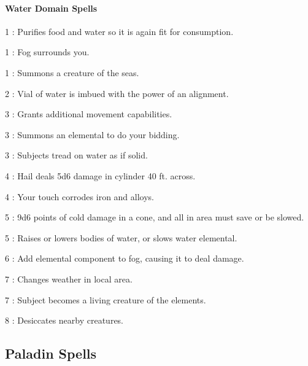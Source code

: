 \paragraph{Water Domain Spells}
\begin{list}{}{\leftmargin=1em}
\item[1] : Purifies food and water so it is again fit for consumption.
\item[1] : Fog surrounds you.
\item[1] : Summons a creature of the seas.
\item[2] : Vial of water is imbued with the power of an alignment.
\item[3] : Grants additional movement capabilities.
\item[3] : Summons an elemental to do your bidding.
\item[3] : Subjects tread on water as if solid.
\item[4] : Hail deals 5d6 damage in cylinder 40 ft. across.
\item[4] : Your touch corrodes iron and alloys.
\item[5] : 9d6 points of cold damage in a cone, and all in area must save or be slowed.
\item[5] : Raises or lowers bodies of water, or slows water elemental.
\item[6] : Add elemental component to fog, causing it to deal damage.
\item[7] : Changes weather in local area.
\item[7] : Subject becomes a living creature of the elements.
\item[8] : Desiccates nearby creatures.
\end{list}
\subsection{Paladin Spells}
